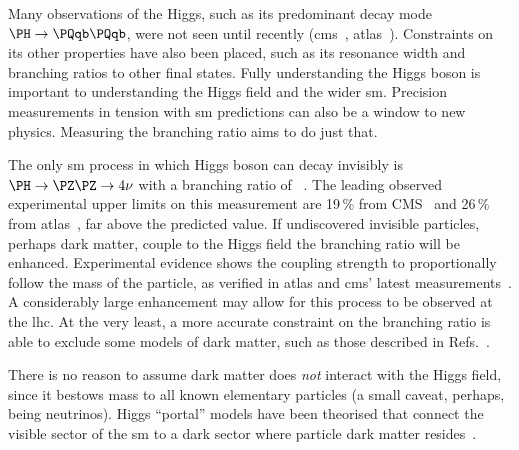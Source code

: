 Many observations of the Higgs, such as its predominant decay mode $\PH \rightarrow \Pqb\Pqb$, were not seen until recently (\acrshort{cms}~\cite{Sirunyan:2018kst}, \acrshort{atlas}~\cite{Aaboud:2018zhk}). Constraints on its other properties have also been placed, such as its resonance width and branching ratios \BR to other final states. Fully understanding the Higgs boson is important to understanding the Higgs field and the wider \acrlong{sm}. Precision measurements in tension with \acrshort{sm} predictions can also be a window to new physics. Measuring the \higgstoinv branching ratio aims to do just that.

The only \acrshort{sm} process in which Higgs boson can decay invisibly is $\PH \rightarrow \PZ\PZ \rightarrow 4\nu$ with a branching ratio of ~\cite{Heinemeyer:1559921}. The leading observed experimental upper limits on this measurement are 19\,\% from CMS~\cite{Sirunyan:2018owy} and 26\,\% from \acrshort{atlas}~\cite{Aaboud:2019rtt}, far above the predicted value. If undiscovered invisible particles, perhaps dark matter, couple to the Higgs field the branching ratio will be enhanced. Experimental evidence shows the coupling strength to proportionally follow the mass of the particle, as verified in \acrshort{atlas} and \acrshort{cms}' latest measurements~\cite{Sopczak:2708121}. A considerably large enhancement may allow for this process to be observed at the \acrshort{lhc}. At the very least, a more accurate constraint on the branching ratio is able to exclude some models of dark matter, such as those described in Refs.~.

There is no reason to assume dark matter does \emph{not} interact with the Higgs field, since it bestows mass to all known elementary particles (a small caveat, perhaps, being neutrinos). Higgs ``portal'' models have been theorised that connect the visible sector of the \acrlong{sm} to a dark sector where particle dark matter resides~\cite{higgs_portal_singlet_dm,Arcadi:2019lka}.





